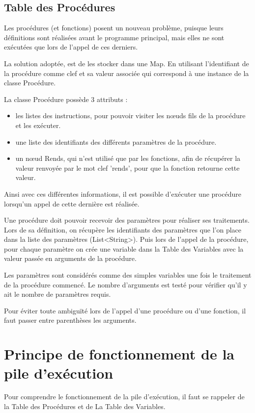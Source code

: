 \documentclass[a4paper,11pt]{article}
\begin{document}
\subsection{Table des Procédures}
Les procédures (et fonctions) posent un nouveau problème, puisque leurs définitions sont réalisées avant le programme principal, mais elles ne sont exécutées que lors de l'appel de ces derniers.

La solution adoptée, est de les stocker dans une Map. En utilisant l'identifiant de la procédure comme clef et sa valeur associée qui correspond à une instance de la classe Procédure.

La classe Procédure possède 3 attributs :
\begin{itemize}
\item les listes des instructions, pour pouvoir visiter les nœuds fils de la procédure et les exécuter.
\item une liste des identifiants des différents paramètres de la procédure.   
\item un nœud Rends, qui n'est utilisé que par les fonctions, afin de récupérer la valeur renvoyée par le mot clef 'rends', pour que la fonction retourne cette valeur.
\end{itemize} 


Ainsi avec ces différentes informations, il est possible d'exécuter une procédure lorsqu'un appel de cette dernière est réalisée.

Une procédure doit pouvoir recevoir des paramètres pour réaliser ses traitements.
Lors de sa définition, on récupère les identifiants des paramètres que l'on place dans la liste des paramètres (List<String>). 
Puis lors de l'appel de la procédure, pour chaque paramètre on crée une variable dans la Table des Variables avec la valeur passée en arguments de la procédure. 

Les paramètres sont considérés comme des simples variables une fois le traitement de la procédure commencé.
Le nombre d'arguments est testé pour vérifier qu'il y ait le nombre de paramètres requis.

Pour éviter toute ambiguïté lors de l'appel d'une procédure ou d'une fonction, il faut passer entre parenthèses les arguments.  

\section{Principe de fonctionnement de la pile d'exécution}
Pour comprendre le fonctionnement de la pile d'exécution, il faut se rappeler de la Table des Procédures et de La Table des Variables.
\end{document}
